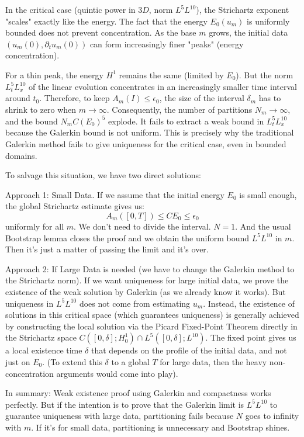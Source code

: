 \documentclass[11pt,letterpaper]{amsart}
\begin{document}
In the critical case (quintic power in $3D$, norm $L^5 L^{10}$), the Strichartz exponent "scales" exactly like the energy. The fact that the energy $E_0(u_m)$ is uniformly bounded does not prevent concentration. As the base $m$ grows, the initial data $(u_m(0), \partial_t u_m(0))$ can form increasingly finer "peaks" (energy concentration).

For a thin peak, the energy $H^1$ remains the same (limited by $E_0$). But the norm $L^5_t L^{10}_x$ of the linear evolution concentrates in an increasingly smaller time interval around $t_0$. Therefore, to keep $A_m(I) \le \epsilon_0$, the size of the interval $\delta_m$ has to shrink to zero when $m \to \infty$. Consequently, the number of partitions $N_m \to \infty$, and the bound $N_m C(E_0)^5$ explode. It fails to extract a weak bound in $L^5_t L^{10}_x$ because the Galerkin bound is not uniform. This is precisely why the traditional Galerkin method fails to give uniqueness for the critical case, even in bounded domains.

To salvage this situation, we have two direct solutions:

Approach 1: Small Data. If we assume that the initial energy $E_0$ is small enough, the global Strichartz estimate gives us: $$A_m([0, T]) \le C E_0 \le \epsilon_0$$ uniformly for all $m$. We don't need to divide the interval. $N=1$. And the usual Bootstrap lemma closes the proof and we obtain the uniform bound $L^5 L^{10}$ in $m$. Then it's just a matter of passing the limit and it's over.

Approach 2: If Large Data is needed (we have to change the Galerkin method to the Strichartz norm).
If we want uniqueness for large initial data, we prove the existence of the weak solution by Galerkin (as we already know it works). But uniqueness in $L^5 L^{10}$ does not come from estimating $u_m$. Instead, the existence of solutions in this critical space (which guarantees uniqueness) is generally achieved by constructing the local solution via the Picard Fixed-Point Theorem directly in the Strichartz space $C([0,\delta]; H_0^1) \cap L^5([0,\delta]; L^{10})$. The fixed point gives us a local existence time $\delta$ that depends on the profile of the initial data, and not just on $E_0$. (To extend this $\delta$ to a global $T$ for large data, then the heavy non-concentration arguments would come into play).

In summary: Weak existence proof using Galerkin and compactness works perfectly. But if the intention is to prove that the Galerkin limit is $L^5 L^{10}$ to guarantee uniqueness with large data, partitioning fails because $N$ goes to infinity with $m$. If it's for small data, partitioning is unnecessary and Bootstrap shines.
\end{document}
